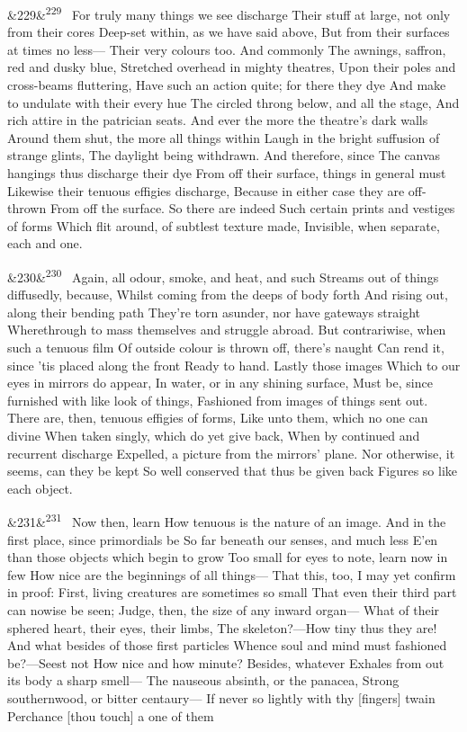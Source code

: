 \documentclass[12pt]{article}
\newcommand{\para}[1][]{\par\noindent\ifx&#1&\else\textsuperscript{\footnotesize #1}~\fi}
\begin{document}
\para[229] For truly many things we see discharge Their stuff at large, not only from their cores Deep-set within, as we have said above, But from their surfaces at times no less--- Their very colours too. And commonly The awnings, saffron, red and dusky blue, Stretched overhead in mighty theatres, Upon their poles and cross-beams fluttering, Have such an action quite; for there they dye And make to undulate with their every hue The circled throng below, and all the stage, And rich attire in the patrician seats. And ever the more the theatre's dark walls Around them shut, the more all things within Laugh in the bright suffusion of strange glints, The daylight being withdrawn. And therefore, since The canvas hangings thus discharge their dye From off their surface, things in general must Likewise their tenuous effigies discharge, Because in either case they are off-thrown From off the surface. So there are indeed Such certain prints and vestiges of forms Which flit around, of subtlest texture made, Invisible, when separate, each and one.

\para[230] Again, all odour, smoke, and heat, and such Streams out of things diffusedly, because, Whilst coming from the deeps of body forth And rising out, along their bending path They're torn asunder, nor have gateways straight Wherethrough to mass themselves and struggle abroad. But contrariwise, when such a tenuous film Of outside colour is thrown off, there's naught Can rend it, since 'tis placed along the front Ready to hand. Lastly those images Which to our eyes in mirrors do appear, In water, or in any shining surface, Must be, since furnished with like look of things, Fashioned from images of things sent out. There are, then, tenuous effigies of forms, Like unto them, which no one can divine When taken singly, which do yet give back, When by continued and recurrent discharge Expelled, a picture from the mirrors' plane. Nor otherwise, it seems, can they be kept So well conserved that thus be given back Figures so like each object.

\para[231] Now then, learn How tenuous is the nature of an image. And in the first place, since primordials be So far beneath our senses, and much less E'en than those objects which begin to grow Too small for eyes to note, learn now in few How nice are the beginnings of all things--- That this, too, I may yet confirm in proof: First, living creatures are sometimes so small That even their third part can nowise be seen; Judge, then, the size of any inward organ--- What of their sphered heart, their eyes, their limbs, The skeleton?---How tiny thus they are! And what besides of those first particles Whence soul and mind must fashioned be?---Seest not How nice and how minute? Besides, whatever Exhales from out its body a sharp smell--- The nauseous absinth, or the panacea, Strong southernwood, or bitter centaury--- If never so lightly with thy [fingers] twain Perchance [thou touch] a one of them
\end{document}
